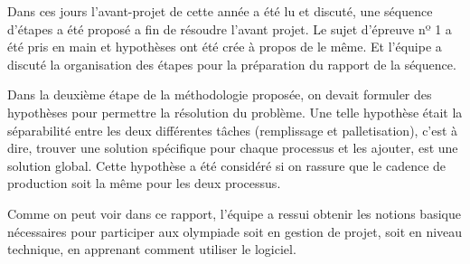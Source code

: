 \documentclass[a4paper,twoside]{articlewithlogo}
\begin{document}
	Dans ces jours l'avant-projet de cette année a été lu et discuté, une séquence d'étapes a été proposé a fin de résoudre l'avant projet. Le sujet d'épreuve nº 1 a été pris en main et hypothèses ont été crée à propos de le même. Et l'équipe a discuté la organisation des étapes pour la préparation du rapport de la séquence.
		











\pagebreak
{}
Dans la deuxième étape de la méthodologie proposée, on devait formuler des hypothèses pour permettre la résolution du problème. Une telle hypothèse était la séparabilité entre les deux différentes tâches (remplissage et palletisation), c'est à dire, trouver une solution spécifique pour chaque processus et les ajouter, est une solution global. Cette hypothèse a été considéré si on rassure que le cadence de production soit la même pour les deux processus.



  
Comme on peut voir dans ce rapport, l'équipe a ressui obtenir les notions basique nécessaires pour participer aux olympiade soit en gestion de projet, soit en niveau technique, en apprenant comment utiliser le logiciel. 

%
%
%
%
%
%
%
%
%
%
%
%































%
\end{document}
